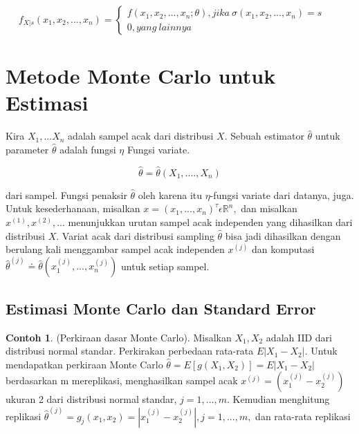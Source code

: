 \documentclass[a4paper,12pt]{article}
\theoremstyle{definition}
\newtheorem{example}{Contoh}[section]
\begin{document}
\begin{equation*}
    f_{X|s}(x_1,x_2,...,x_n)=\left\{\begin{matrix}
f(x_1,x_2,...,x_n;\theta), jika \ \sigma (x_1,x_2,...,x_n)=s &  & \\ 
0, yang \ lainnya&  & 
\end{matrix}\right.
\end{equation*}

\section{Metode Monte Carlo untuk Estimasi}
Kira $X_{1},...X_{n}$ adalah sampel acak dari distribusi $X$. Sebuah estimator $\hat{\theta}$ untuk parameter $\hat{\theta}$ adalah fungsi $\eta$ Fungsi variate.

\begin{equation*}
     \hat{\theta} = \hat{\theta} \left ( X_{1},....,X_{n}\right )
\end{equation*}

dari sampel. Fungsi penaksir $\hat{\theta}$ oleh karena itu $\eta$-fungsi variate dari datanya, juga. Untuk kesederhanaan, misalkan $x = \left ( x_{1}, ..., x_{n} \right )^{\tau}\epsilon\mathbb{R}^{n},$ dan misalkan $x^{(1)}, x^{(2)}, ...$ menunjukkan urutan sampel acak independen yang dihasilkan dari distribusi $X$. Variat acak dari distribusi sampling $\hat{\theta}$ bisa jadi dihasilkan dengan berulang kali menggambar sampel acak independen $x^{\left ( j \right )}$ dan komputasi $\hat{\theta} ^{\left ( j \right )} \doteq  \hat{\theta} (x_{1}^{(j)},...,x_{n}^{(j)})$ untuk setiap sampel. 

\subsection{Estimasi Monte Carlo dan Standard Error}

\begin{example}
    (Perkiraan dasar Monte Carlo). Misalkan $X_{1},X_{2} $ adalah IID dari distribusi normal standar. Perkirakan perbedaan rata-rata $E\left | X_{1}-X_{2} \right |$. Untuk mendapatkan perkiraan Monte Carlo $\hat{\theta} = E\left [ g\left ( X_{1},X_{2} \right ) \right ] = E\left | X_{1}-X_{2} \right |$ berdasarkan m mereplikasi, menghasilkan sampel acak $x^{(j)} = (x^{(j)}_{1}-x^{(j)}_{2})$ ukuran 2 dari distribusi normal standar, $j=1,...,m$. Kemudian menghitung replikasi $\hat{\theta} ^{(j)} = g_{j}(x_{1},x_{2})=\left | x^{(j)}_{1}-x^{(j)}_{2} \right |, j = 1,...,m,$  dan rata-rata replikasi 
\end{example}
\end{document}
